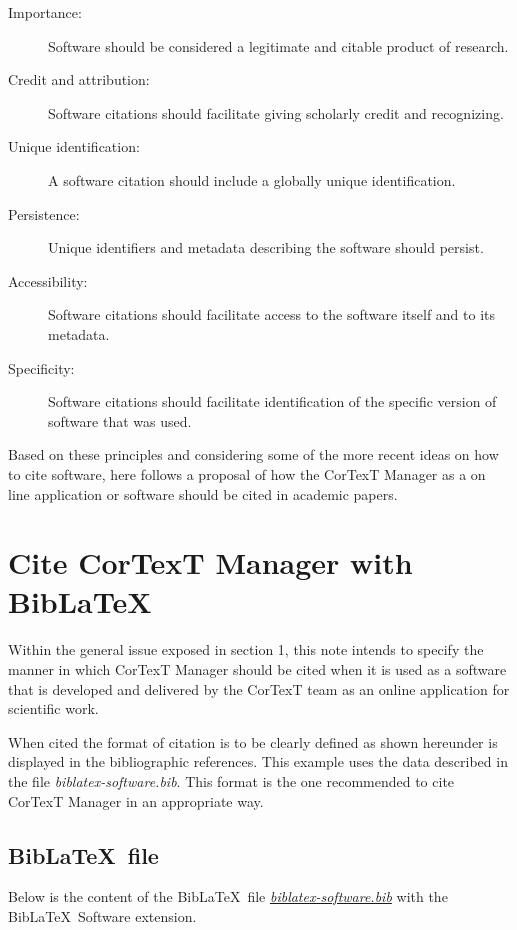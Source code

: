 \documentclass{article}
\begin{document}
\begin{description}
  \item[Importance:] Software should be considered a legitimate and citable product of research.
  \item[Credit and attribution:] Software citations should facilitate giving scholarly credit and recognizing.
  \item[Unique identification:] A software citation should include a globally unique identification.
  \item[Persistence:] Unique identifiers and metadata describing the software should persist.
  \item[Accessibility:] Software citations should facilitate access to the software itself and to its metadata.
  \item[Specificity:] Software citations should facilitate identification of the specific version of software that was used.
\end{description}

Based on these principles and considering some of the more recent ideas on how
to cite software, here follows a proposal of how the CorTexT Manager as a on
line application or software should be cited in academic papers.

\section{Cite CorTexT Manager with Bib\LaTeX} \label{example-biblatex}

Within the general issue exposed in section 1, this note intends to specify the
manner in which CorTexT Manager should be cited when it is used as a software
that is developed and delivered by the CorTexT team as an online application
for scientific work.

When cited the format of citation is to be clearly defined as shown hereunder
\cite{cortext_manager_v2} is displayed in the bibliographic references. This
example uses the data described in the file {\em biblatex-software.bib}.  This
format is the one recommended to cite CorTexT Manager in an appropriate way.

\printbibliography[type=software,keyword=cortext-biblatex,title={\small References (example)}]

\subsection{Bib\LaTeX \ file}

Below is the content of the Bib\LaTeX \ file
\href{https://github.com/cortext/how-to-cite-cortext/blob/main/biblatex-software.bib}{\em biblatex-software.bib}
with the Bib\LaTeX \ Software extension\cite{softwareheritageorg_citing_2020}.
\end{document}
